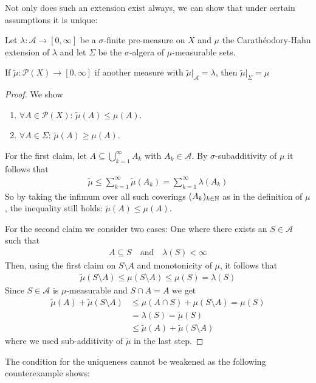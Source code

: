 Not only does such an extension exist always, we can show that under certain assumptions it is unique:
\begin{thm}
  Let $\lambda: \mathcal{A} \to  [0,\infty]$ be a $\sigma$-finite pre-measure on $X$ and $\mu$ the Carathéodory-Hahn extension of $\lambda$ and let $\Sigma$ be the $\sigma$-algera of $\mu$-measurable sets.

  If $\tilde{\mu}: \mathcal{P}(X) \to [0,\infty]$ if another measure with $\tilde{\mu}|_{\mathcal{A}} = \lambda$, then $\tilde{\mu}|_{\Sigma} = \mu$
\end{thm}
\begin{proof}
  We show
  \begin{enumerate}
    \item $\forall A \in \mathcal{P}(X)$: $\tilde{\mu}(A) \leq \mu(A)$.
    \item $\forall A \in \Sigma$: $\tilde{\mu}(A) \geq \mu(A)$.
  \end{enumerate}
  For the first claim, let $A \subseteq \bigcup_{k=1}^{\infty}A_k$ with $A_k \in \mathcal{A}$.
  By $\sigma$-subadditivity of $\mu$ it follows that
\begin{align*}
  \tilde{\mu} \leq \sum_{k=1}^{\infty}\tilde{\mu}(A_k) = \sum_{k=1}^{\infty}\lambda(A_k)
\end{align*}
So by taking the infimum over all such coverings $(A_k)_{k \in \mathbb{N}}$ as in the definition of $\mu$, the inequality still holds: $\tilde{\mu}(A) \leq \mu(A)$.

  For the second claim we consider two cases: One where there exists an $S \in \mathcal{A}$ such that
  \begin{align*}
    A \subseteq S \quad \text{and} \quad \lambda(S) < \infty
  \end{align*}
  Then, using the first claim on $S \setminus A$ and monotonicity of $\mu$, it follows that
  \begin{align*}
    \tilde{\mu}(S \setminus A) \leq \mu(S \setminus A) \leq \mu(S) = \lambda(S)
  \end{align*}
    Since $S \in \mathcal{A}$ is $\mu$-measurable and $S \cap A = A$ we get
  \begin{align*}
    \tilde{\mu}(A) + \tilde{\mu}(S \setminus A) 
    &\leq
    \mu(A \cap S) + \mu(S \setminus A) = \mu(S)\\
    &=
    \lambda(S) = \tilde{\mu}(S)\\
    &\leq 
    \tilde{\mu}(A) + \tilde{\mu}(S \setminus A)
  \end{align*}
  where we used sub-additivity of $\tilde{\mu}$ in the last step.
\end{proof}


The condition for the uniqueness cannot be weakened as the following counterexample shows:
\begin{ex}[]

\end{ex}
